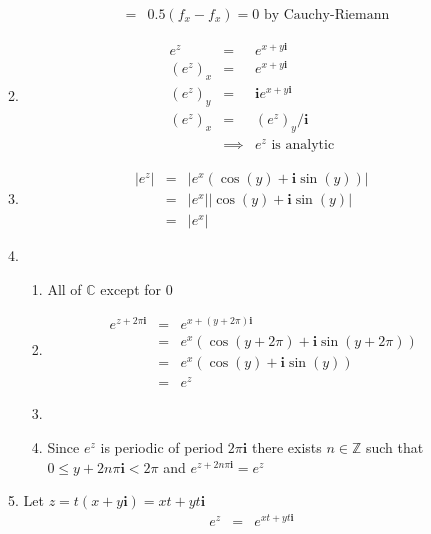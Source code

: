 \documentclass{article}%
\newcommand\abs[1]{\left|#1\right|}
\newcommand\I{\textbf{i}}
\begin{document}
\begin{enumerate}
\begin{enumerate}[label*=\arabic*.]
\begin{eqnarray*}
                                                    &=& 0.5 (f_x - f_x) = 0 \text{ by Cauchy-Riemann}
            \end{eqnarray*}
        \setcounter{enumii}{30}
        \item %
        \begin{eqnarray*}
            e^z &=& e^{x+y\I} \\
            (e^z)_x &=& e^{x+y\I} \\
            (e^z)_y &=& \I e^{x+y\I} \\
            (e^z)_x &=& (e^z)_y / \I \\
                   &\implies& e^z \text{ is analytic}
        \end{eqnarray*}
        \setcounter{enumii}{33}
        \item %
            \begin{eqnarray*}
                \abs{e^z} &=& \abs{e^x(\cos(y)+\I\sin(y))} \\
                          &=& \abs{e^x}\abs{\cos(y)+\I\sin(y)} \\
                          &=& \abs{e^x}
            \end{eqnarray*}
        \item %
        \begin{enumerate}[label=(\alph*)]
            \item %
                All of $\mathbb{C}$ except for $0$
            \item %
            \begin{eqnarray*}
                e^{z+2\pi\I} &=& e^{x+(y+2\pi)\I} \\
                             &=& e^x(\cos(y+2\pi)+\I\sin(y+2\pi)) \\
                             &=& e^x(\cos(y)+\I\sin(y)) \\
                             &=& e^z
            \end{eqnarray*}
            \item %
            \item %
                Since $e^z$ is periodic of period $2\pi\I$ there exists $n\in\mathbb{Z}$ such that $0 \leq y+2n\pi\I < 2\pi$ and $e^{z + 2n\pi\I} = e^z$
        \end{enumerate}
        \item %
        Let $z=t(x+y\I)=xt+yt\I$
        \begin{eqnarray*}
            e^z &=& e^{xt+yt\I} \\

\end{eqnarray*}
\end{enumerate}
\end{enumerate}
\end{document}
